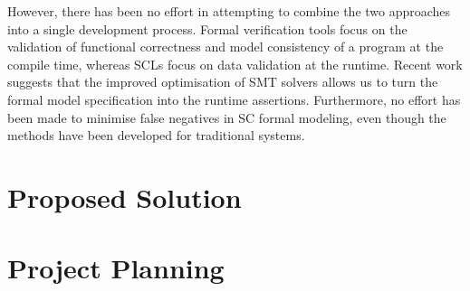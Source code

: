 \documentclass[oneside]{ecsproject}     %
\begin{document}
However, there has been no effort in attempting to combine the two approaches into a single development process. Formal verification tools
focus on the validation of functional correctness and model consistency of a program at the compile time, whereas SCLs focus on data validation 
at the runtime. Recent work suggests that the improved optimisation of SMT solvers allows us to turn the formal model specification into 
the runtime assertions\cite{runtime_assert}. Furthermore, no effort has been made to minimise false negatives in SC formal modeling, 
even though the methods have been developed for traditional systems\cite{even_b}.


\chapter{Proposed Solution} \label{Chapter:Solution}


\chapter{Project Planning}




\appendix
\end{document}
